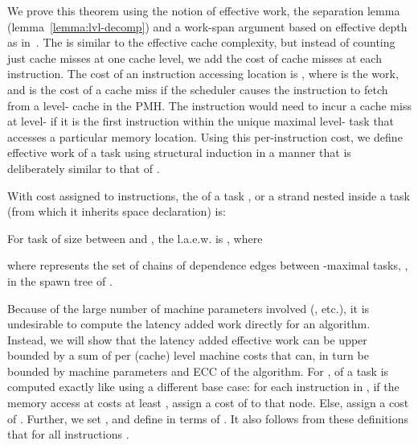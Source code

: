 We prove this theorem using the notion of effective work, the
separation lemma (lemma~\ref{lemma:lvl-decomp}) and a work-span
argument based on effective depth as in~\cite{BlellochFiGi11}.
The  is similar to the effective
cache complexity, but instead of counting just cache misses at one
cache level, we add the cost of cache misses at each instruction.
The cost  of an instruction  accessing location  is
, where  is the work, and  is the cost of a cache miss if the scheduler causes
the instruction  to fetch  from a level- cache in the
PMH. The instruction would need to incur a cache miss at level- if
it is the first instruction within the unique maximal level- task
that accesses a particular memory location.  Using this
per-instruction cost, we define effective work  of a task
using structural induction in a manner that is deliberately similar to
that of .

\begin{definition}
With cost  assigned to instructions, the  of a task , or a strand  nested inside a
task  (from which it inherits space declaration) is:
\noindent{}

\noindent{}  For task  of size between  and ,
 the l.a.e.w. is , where
  

where  represents the set of chains of dependence edges
between -maximal tasks, , in the spawn tree of .
\end{definition}

Because of the large number of machine parameters involved
(, etc.), it is undesirable to compute the latency
added work directly for an algorithm.  Instead, we will show that the
latency added effective work can be upper bounded by a sum of per
(cache) level machine costs  that can, in turn be
bounded by machine parameters and ECC of the algorithm.  For
,  of a task  is computed exactly like
 using a different base case: for each instruction  in
, if the memory access at  costs at least , assign a
cost of  to that node.  Else, assign a cost of
.  Further, we set , and define
 in terms of . It also follows from
these definitions that  for all instructions .

